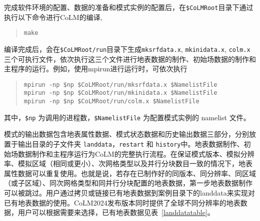 完成软件环境的配置、数据的准备和模式实例的配置后，在\texttt{\$CoLMRoot}目录下通过执行以下命令进行CoLM的编译,
\begin{quote}
\begin{lstlisting}
make
\end{lstlisting}
\end{quote}
编译完成后，会在\texttt{\$CoLMRoot/run}目录下生成\texttt{mksrfdata.x}, \texttt{mkinidata.x}, \texttt{colm.x} 三个可执行文件，依次执行这三个文件进行地表数据的制作、初始场数据的制作和主程序的运行。例如，使用mpirun进行运行时，可依次执行
\begin{quote}\label{runcolm}
\begin{lstlisting}
mpirun -np $np $CoLMRoot/run/mksrfdata.x $NamelistFile
mpirun -np $np $CoLMRoot/run/mkinidata.x $NamelistFile
mpirun -np $np $CoLMRoot/run/colm.x $NamelistFile
\end{lstlisting}
\end{quote}
其中，\verb|$np| 为调用的进程数，\verb|$NamelistFile| 为配置模式实例的 namelist 文件。

模式的输出数据包含地表属性数据、模式状态数据和历史输出数据三部分，分别放置于输出目录的子文件夹 \texttt{landdata}，\texttt{restart} 和 \texttt{history}中。地表数据制作、初始场数据制作和主程序运行为CoLM的完整执行流程。在保证模式版本、模拟分辨率、模拟区域（相同或更小）、次网格类型以及并行分块数目一致的情况下，地表属性数据可以重复使用。也就是说，若存在已制作好的同版本、同分辨率、同区域（或子区域）、同次网格类型和同并行分块配置的地表数据，第一步地表数据制作可以被跳过。用户通过拷贝或链接已有地表数据到案例目录下的landdata来实现对已有地表数据的使用。CoLM2024发布版本同时提供了全球不同分辨率的地表数据，用户可以根据需要来选择，已有地表数据见表~\ref{landdatatable}。

